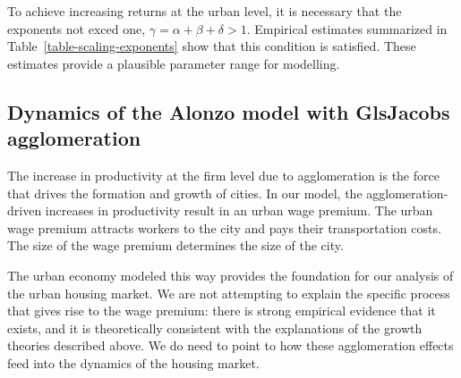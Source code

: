 To achieve increasing returns at the urban level, it is necessary that the exponents not exced one, $\gamma=\alpha+ \beta + \delta > 1$.  Empirical  estimates summarized in Table~\ref{table-scaling-exponents} show that this condition is satisfied. These estimates provide a plausible parameter range for modelling. 


% 
% 
\subsection{Dynamics of the Alonzo model with Gls{Jacobs agglomeration}}
The increase in productivity at the firm level due to agglomeration is the force that drives the formation and growth of cities. In our model, the agglomeration-driven increases in productivity result in an \gls{urban wage premium}. The urban wage premium attracts workers to the city and pays their transportation costs. The size of the wage premium determines the size of the city.

The urban economy modeled this way provides the foundation for our analysis of the urban housing market. We are not attempting to explain the specific process that gives rise to the wage premium: there is strong empirical evidence that it exists, and it is theoretically consistent with the explanations of the growth theories described above. We do need to point to how these agglomeration effects feed into the dynamics of the housing market.


